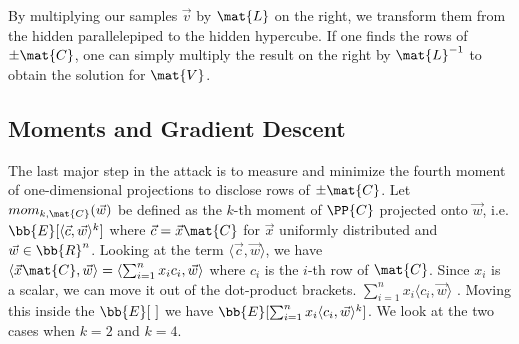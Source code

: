 By multiplying our samples $\vec{v}$ by $\mat{L}$ on the right, we transform them from the hidden parallelepiped to the hidden hypercube. If one finds
the rows of $\pm \mat{C}$, one can simply multiply the result on the right by $\mat{L}^{-1}$ to obtain the solution for $\mat{V}$.

\subsection{Moments and Gradient Descent}
The last major step in the attack is to measure and minimize the fourth moment of one-dimensional projections to disclose rows of $\pm \mat{C}$.
Let $mom_{k, \mat{C}}(\vec{w})$ be defined as the $k$-th moment of $\PP{C}$ projected onto $\vec{w}$, i.e. 
$\bb{E}[\langle \vec{c}, \vec{w} \rangle ^k]$ where $\vec{c} = \vec{x} \mat{C}$ for $\vec{x}$ uniformly distributed and $\vec{w} \in \bb{R}^n$.
Looking at the term $\langle \vec{c}, \vec{w} \rangle$, we have $\langle \vec{x} \mat{C}, \vec{w} \rangle = \langle \sum_{i=1}^{n} x_i c_i, \vec{w} \rangle$
where $c_i$ is the $i$-th row of $\mat{C}$. Since $x_i$ is a scalar, we can move it out of the dot-product brackets. $\sum_{i=1}^{n} x_i \langle c_i, \vec{w} \rangle $ .
Moving this inside the $\bb{E}[ \ ]$ we have $\bb{E}[\sum_{i=1}^{n} x_i \langle c_i, \vec{w} \rangle ^k ]$.
We look at the two cases when $k = 2$ and $k=4$.
